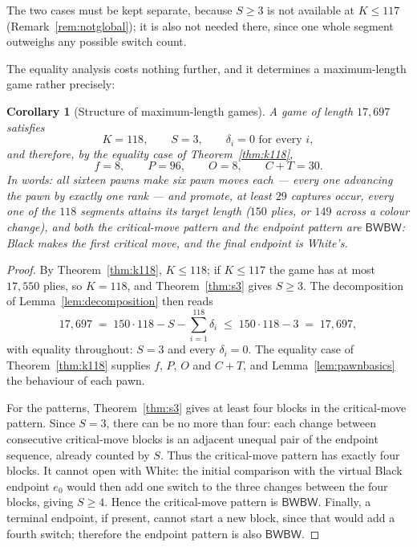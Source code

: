 \documentclass[11pt]{article}
\newtheorem{corollary}[theorem]{Corollary}
\theoremstyle{definition}
\theoremstyle{remark}
\theoremstyle{plain}
\begin{document}
The two cases must be kept separate, because $S \ge 3$ is not available at
$K \le 117$ (Remark~\ref{rem:notglobal}); it is also not needed there,
since one whole segment outweighs any possible switch count.

The equality analysis costs nothing further, and it determines a
maximum-length game rather precisely:

\begin{corollary}[Structure of maximum-length games]\label{cor:structure}
A game of length $17{,}697$ satisfies
\[
  K = 118, \qquad S = 3, \qquad \delta_i = 0 \text{ for every } i,
\]
and therefore, by the equality case of Theorem~\ref{thm:k118},
\[
  f = 8, \qquad P = 96, \qquad O = 8, \qquad C + T = 30 .
\]
In words: all sixteen pawns make six pawn moves each --- every one
advancing the pawn by exactly one rank --- and promote, at least $29$
captures occur, every one of the $118$ segments
attains its target length ($150$ plies, or $149$ across a colour change),
and both the critical-move pattern and the endpoint pattern are
$\mathsf{BWBW}$: Black makes the first critical move, and the final
endpoint is White's.
\end{corollary}

\begin{proof}
By Theorem~\ref{thm:k118}, $K \le 118$; if $K \le 117$ the game has at
most $17{,}550$ plies, so $K = 118$, and Theorem~\ref{thm:s3} gives
$S \ge 3$. The decomposition of Lemma~\ref{lem:decomposition} then reads
\[
  17{,}697 \;=\; 150 \cdot 118 - S - \sum_{i=1}^{118} \delta_i
  \;\le\; 150 \cdot 118 - 3 \;=\; 17{,}697,
\]
with equality throughout: $S = 3$ and every $\delta_i = 0$. The equality
case of Theorem~\ref{thm:k118} supplies $f$, $P$, $O$ and $C + T$, and
Lemma~\ref{lem:pawnbasics} the behaviour of each pawn.

For the patterns, Theorem~\ref{thm:s3} gives at least four blocks in
the critical-move pattern. Since $S = 3$, there can be no more than
four: each change between consecutive critical-move blocks is an
adjacent unequal pair of the endpoint sequence, already counted by $S$.
Thus the critical-move pattern has exactly four blocks. It cannot open
with White: the initial comparison with the virtual Black endpoint
$e_0$ would then add one switch to the three changes between the four
blocks, giving $S \ge 4$. Hence the critical-move pattern is
$\mathsf{BWBW}$. Finally, a terminal endpoint, if present, cannot start
a new block, since that would add a fourth switch; therefore the
endpoint pattern is also $\mathsf{BWBW}$.
\end{proof}
\end{document}
